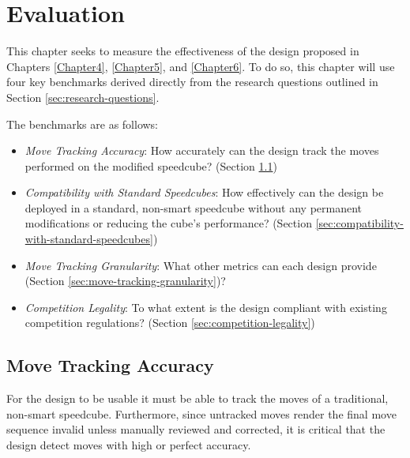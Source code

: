 %

\chapter{Evaluation}
\label{Chapter7}

This chapter seeks to measure the effectiveness of the design proposed
in Chapters \ref{Chapter4}, \ref{Chapter5}, and \ref{Chapter6}. To do
so, this chapter will use four key benchmarks derived directly from the
research questions outlined in Section \ref{sec:research-questions}.

The benchmarks are as follows:

\begin{itemize}

    \item \emph{Move Tracking Accuracy}: How accurately can the design
    track the moves performed on the modified speedcube? (Section
    \ref{sec:move-tracking-accuracy})

    \item \emph{Compatibility with Standard Speedcubes}: How
    effectively can the design be deployed in a standard, non-smart
    speedcube without any permanent modifications or reducing the
    cube's performance? (Section
    \ref{sec:compatibility-with-standard-speedcubes})
    
    \item \emph{Move Tracking Granularity}: What other metrics can each 
    design provide (Section \ref{sec:move-tracking-granularity})?
    
    \item \emph{Competition Legality}: To what extent is the design
    compliant with existing competition regulations? (Section
    \ref{sec:competition-legality})
    
\end{itemize}


\section{Move Tracking Accuracy}
\label{sec:move-tracking-accuracy}

For the design to be usable it must be able to track the moves of a
traditional, non-smart speedcube. Furthermore, since untracked moves
render the final move sequence invalid unless manually reviewed and
corrected, it is critical that the design detect moves with high or
perfect accuracy.

